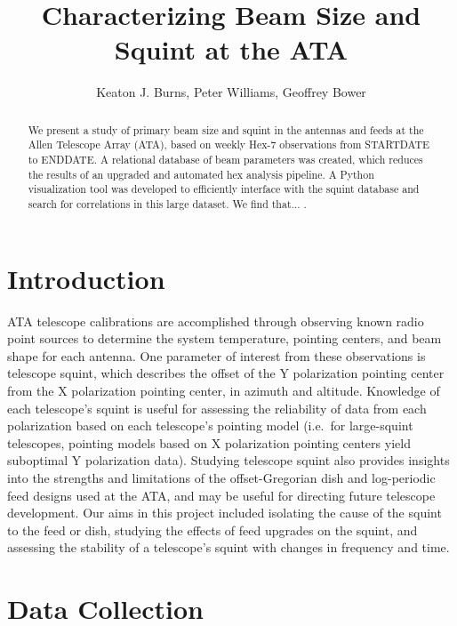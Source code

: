 \documentclass[preprint]{aastex}
\begin{document}
\title{Characterizing Beam Size and Squint at the ATA}
\author{Keaton J. Burns, Peter Williams, Geoffrey Bower}

\begin{abstract}
We present a study of primary beam size and squint in the antennas and
feeds at the Allen Telescope Array (ATA), based on weekly Hex-7
observations from STARTDATE to ENDDATE.  A relational database of beam
parameters was created, which reduces the results of an upgraded and
automated hex analysis pipeline.  A Python visualization tool was
developed to efficiently interface with the squint database and search
for correlations in this large dataset.  We find that...  .
\end{abstract}

\tableofcontents


\section{Introduction}\label{s.intro}
ATA telescope calibrations are accomplished through observing known
radio point sources to determine the system temperature, pointing
centers, and beam shape for each antenna.  One parameter of interest
from these observations is telescope squint, which describes the
offset of the Y polarization pointing center from the X polarization
pointing center, in azimuth and altitude.  Knowledge of each
telescope's squint is useful for assessing the reliability of data
from each polarization based on each telescope's pointing model
(i.e.~for large-squint telescopes, pointing models based on X
polarization pointing centers yield suboptimal Y polarization
data). Studying telescope squint also provides insights into the
strengths and limitations of the offset-Gregorian dish and
log-periodic feed designs used at the ATA, and may be useful for
directing future telescope development.  Our aims in this project
included isolating the cause of the squint to the feed or dish,
studying the effects of feed upgrades on the squint, and assessing the
stability of a telescope's squint with changes in frequency and time.


\section{Data Collection}\label{s.datacollection}
\end{document}
